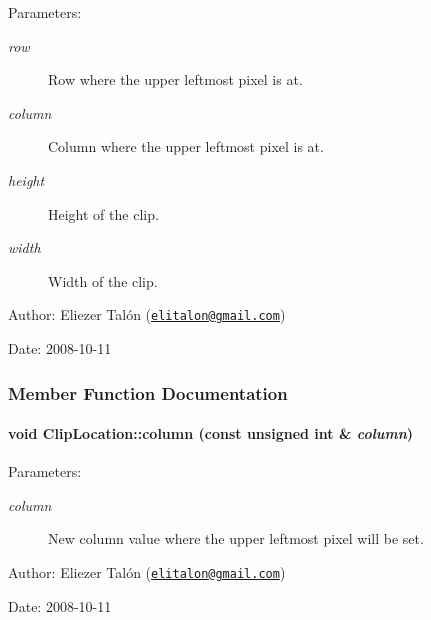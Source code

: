 \begin{Desc}
\item[Parameters:]
\begin{description}
\item[{\em row}]Row where the upper leftmost pixel is at. \item[{\em column}]Column where the upper leftmost pixel is at. \item[{\em height}]Height of the clip. \item[{\em width}]Width of the clip.\end{description}
\end{Desc}
\begin{Desc}
\item[Author:]Eliezer Talón (\href{mailto:elitalon@gmail.com}{\tt elitalon@gmail.com}) \end{Desc}
\begin{Desc}
\item[Date:]2008-10-11 \end{Desc}


\subsubsection{Member Function Documentation}
\hypertarget{class_clip_location_321238ca06a98bcce5f5292c1ea3e6c0}{
\paragraph[{column}]{\setlength{\rightskip}{0pt plus 5cm}void ClipLocation::column (const unsigned int \& {\em column})}\hfill}
\label{class_clip_location_321238ca06a98bcce5f5292c1ea3e6c0}


\begin{Desc}
\item[Parameters:]
\begin{description}
\item[{\em column}]New column value where the upper leftmost pixel will be set.\end{description}
\end{Desc}
\begin{Desc}
\item[Author:]Eliezer Talón (\href{mailto:elitalon@gmail.com}{\tt elitalon@gmail.com}) \end{Desc}
\begin{Desc}
\item[Date:]2008-10-11 \end{Desc}


